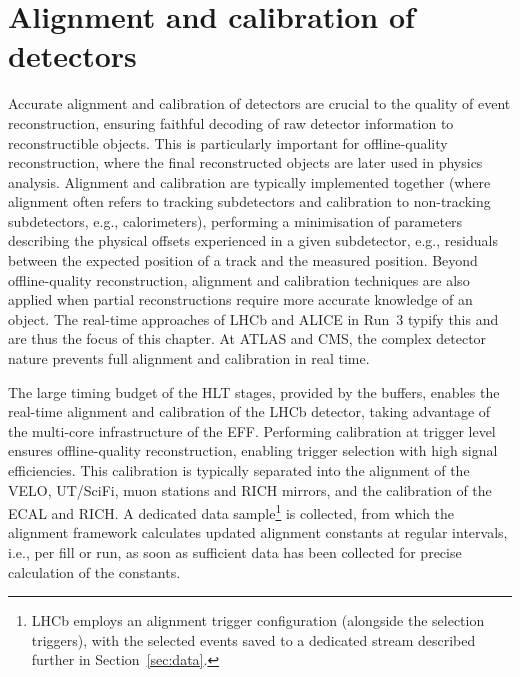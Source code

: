 \section{Alignment and calibration of detectors}

Accurate alignment and calibration of detectors are crucial to the quality of event reconstruction, ensuring faithful decoding of raw detector information to reconstructible objects. This is particularly important for offline-quality reconstruction, where the final reconstructed objects are later used in physics analysis. Alignment and calibration are typically implemented together (where alignment often refers to tracking subdetectors and calibration to non-tracking subdetectors, e.g., calorimeters), performing a minimisation of parameters describing the physical offsets experienced in a given subdetector, e.g., residuals between the expected position of a track and the measured position. Beyond offline-quality reconstruction, alignment and calibration techniques are also applied when partial reconstructions require more accurate knowledge of an object. The real-time approaches of LHCb and ALICE in Run~3 typify this and are thus the focus of this chapter. At ATLAS and CMS, the complex detector nature prevents full alignment and calibration in real time.

The large timing budget of the HLT stages, provided by the buffers, enables the real-time alignment and calibration of the LHCb detector, taking advantage of the multi-core infrastructure of the EFF. Performing calibration at trigger level ensures offline-quality reconstruction, enabling trigger selection with high signal efficiencies. This calibration is typically separated into the alignment of the VELO, UT/SciFi, muon stations and RICH mirrors, and the calibration of the ECAL and RICH. A dedicated data sample\footnote{LHCb employs an alignment trigger configuration (alongside the selection triggers), with the selected events saved to a dedicated stream described further in Section~\ref{sec:data}.} is collected, from which the alignment framework calculates updated alignment constants at regular intervals, i.e., per fill or run, as soon as sufficient data has been collected for precise calculation of the constants.

